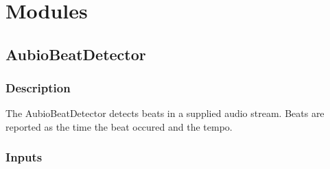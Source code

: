 \documentclass[a4paper]{article}
\begin{document}
	
\section{Modules}
	\subsection{AubioBeatDetector}
		\subsubsection{Description}
			The AubioBeatDetector detects beats in a supplied audio stream.
			Beats are reported as the time the beat occured and the tempo.
		\subsubsection{Inputs}
\end{document}

